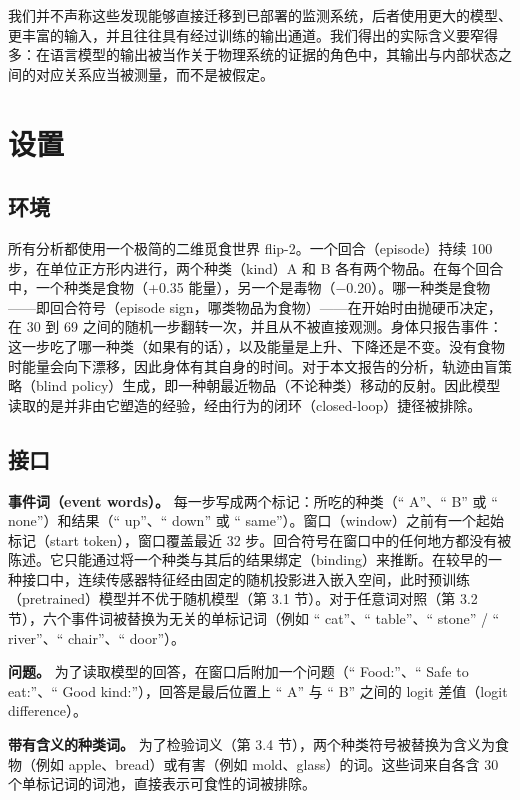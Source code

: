 \documentclass[UTF8,fontset=none,a4paper]{ctexart}
\begin{document}
我们并不声称这些发现能够直接迁移到已部署的监测系统，后者使用更大的模型、更丰富的输入，并且往往具有经过训练的输出通道。我们得出的实际含义要窄得多：在语言模型的输出被当作关于物理系统的证据的角色中，其输出与内部状态之间的对应关系应当被测量，而不是被假定。


\section{设置}

\subsection{环境}

所有分析都使用一个极简的二维觅食世界 \mbox{flip-2}。一个回合（episode）持续 100 步，在单位正方形内进行，两个种类（kind）A 和 B 各有两个物品。在每个回合中，一个种类是食物（+0.35 能量），另一个是毒物（$-$0.20）。哪一种类是食物------即回合符号（episode sign，哪类物品为食物）------在开始时由抛硬币决定，在 30 到 69 之间的随机一步翻转一次，并且从不被直接观测。身体只报告事件：这一步吃了哪一种类（如果有的话），以及能量是上升、下降还是不变。没有食物时能量会向下漂移，因此身体有其自身的时间。对于本文报告的分析，轨迹由盲策略（blind policy）生成，即一种朝最近物品（不论种类）移动的反射。因此模型读取的是并非由它塑造的经验，经由行为的闭环（\mbox{closed-loop}）捷径被排除。

\subsection{接口}

\textbf{事件词（event words）。} 每一步写成两个标记：所吃的种类（`` A''、`` B'' 或 `` none''）和结果（`` up''、`` down'' 或 `` same''）。窗口（window）之前有一个起始标记（start token），窗口覆盖最近 32 步。回合符号在窗口中的任何地方都没有被陈述。它只能通过将一个种类与其后的结果绑定（binding）来推断。在较早的一种接口中，连续传感器特征经由固定的随机投影进入嵌入空间，此时预训练（pretrained）模型并不优于随机模型（第 3.1 节）。对于任意词对照（第 3.2 节），六个事件词被替换为无关的单标记词（例如 `` cat''、`` table''、`` stone'' / `` river''、`` chair''、`` door''）。

\textbf{问题。} 为了读取模型的回答，在窗口后附加一个问题（`` Food:''、`` Safe to eat:''、`` Good kind:''），回答是最后位置上 `` A'' 与 `` B'' 之间的 logit 差值（logit difference）。

\textbf{带有含义的种类词。} 为了检验词义（第 3.4 节），两个种类符号被替换为含义为食物（例如 apple、bread）或有害（例如 mold、glass）的词。这些词来自各含 30 个单标记词的词池，直接表示可食性的词被排除。
\end{document}
